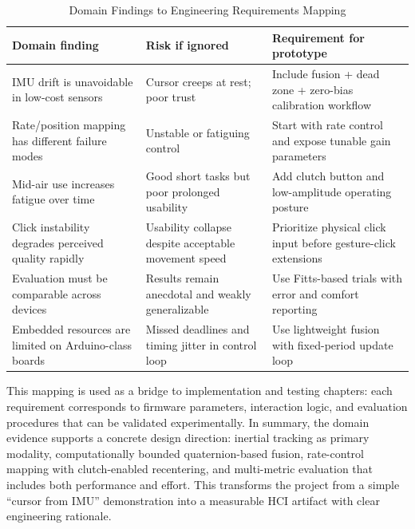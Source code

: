 \begin{table}[!htb]
\centering
\footnotesize
\caption{Domain Findings to Engineering Requirements Mapping}
\label{tbl:domain_requirements}
\begin{tabularx}{0.86\textwidth}{|Y|Y|Y|}
\hline
\textbf{Domain finding} & \textbf{Risk if ignored} & \textbf{Requirement for prototype} \\
\hline
IMU drift is unavoidable in low-cost sensors & Cursor creeps at rest; poor trust & Include fusion + dead zone + zero-bias calibration workflow \\
\hline
Rate/position mapping has different failure modes & Unstable or fatiguing control & Start with rate control and expose tunable gain parameters \\
\hline
Mid-air use increases fatigue over time & Good short tasks but poor prolonged usability & Add clutch button and low-amplitude operating posture \\
\hline
Click instability degrades perceived quality rapidly & Usability collapse despite acceptable movement speed & Prioritize physical click input before gesture-click extensions \\
\hline
Evaluation must be comparable across devices & Results remain anecdotal and weakly generalizable & Use Fitts-based trials with error and comfort reporting \\
\hline
Embedded resources are limited on Arduino-class boards & Missed deadlines and timing jitter in control loop & Use lightweight fusion with fixed-period update loop \\
\hline
\end{tabularx}
\normalsize
\end{table}

This mapping is used as a bridge to implementation and testing chapters: each requirement corresponds to firmware parameters, interaction logic, and evaluation procedures that can be validated experimentally. In summary, the domain evidence supports a concrete design direction: inertial tracking as primary modality, computationally bounded quaternion-based fusion, rate-control mapping with clutch-enabled recentering, and multi-metric evaluation that includes both performance and effort. This transforms the project from a simple ``cursor from IMU'' demonstration into a measurable HCI artifact with clear engineering rationale.